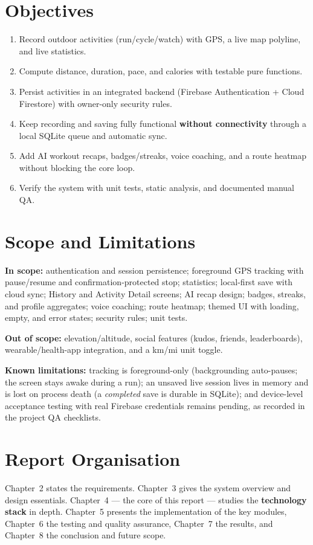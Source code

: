 \documentclass[12pt, a4paper]{report}
\begin{document}
\section{Objectives}
\begin{enumerate}[leftmargin=1.2cm]
  \item Record outdoor activities (run/cycle/watch) with GPS, a live map
        polyline, and live statistics.
  \item Compute distance, duration, pace, and calories with testable pure
        functions.
  \item Persist activities in an integrated backend (Firebase Authentication
        + Cloud Firestore) with owner-only security rules.
  \item Keep recording and saving fully functional \textbf{without
        connectivity} through a local SQLite queue and automatic sync.
  \item Add AI workout recaps, badges/streaks, voice coaching, and a route
        heatmap without blocking the core loop.
  \item Verify the system with unit tests, static analysis, and documented
        manual QA.
\end{enumerate}

\section{Scope and Limitations}
\textbf{In scope:} authentication and session persistence; foreground GPS
tracking with pause/resume and confirmation-protected stop; statistics;
local-first save with cloud sync; History and Activity Detail screens; AI
recap design; badges, streaks, and profile aggregates; voice coaching; route
heatmap; themed UI with loading, empty, and error states; security rules;
unit tests.

\textbf{Out of scope:} elevation/altitude, social features (kudos, friends,
leaderboards), wearable/health-app integration, and a km/mi unit toggle.

\textbf{Known limitations:} tracking is foreground-only (backgrounding
auto-pauses; the screen stays awake during a run); an unsaved live session
lives in memory and is lost on process death (a \emph{completed} save is
durable in SQLite); and device-level acceptance testing with real Firebase
credentials remains pending, as recorded in the project QA checklists.

\section{Report Organisation}
Chapter~2 states the requirements. Chapter~3 gives the system overview and
design essentials. Chapter~4 --- the core of this report --- studies the
\textbf{technology stack} in depth. Chapter~5 presents the implementation of
the key modules, Chapter~6 the testing and quality assurance,
Chapter~7 the results, and Chapter~8 the conclusion and future scope.
\end{document}
